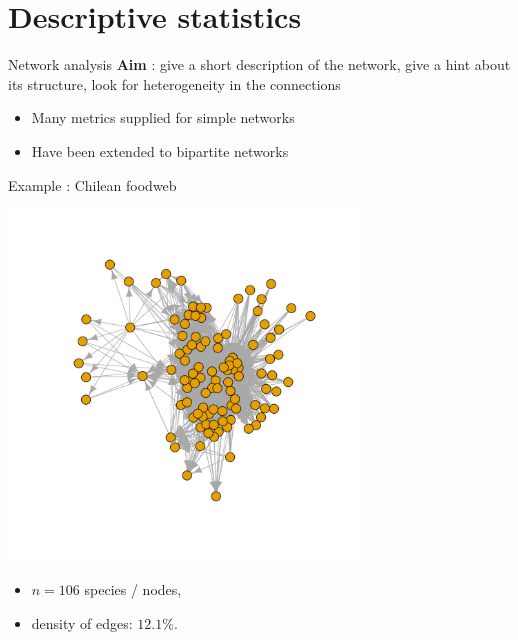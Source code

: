 \documentclass[compress,10pt]{beamer}
\newcommand{\myemph}[1]{\textbf{\textcolor{dgreen}{#1}}}
\begin{document}
\section{Descriptive statistics}


   \begin{frame}{Network analysis}
\myemph{Aim} : give a short description of the network, give a hint about its structure, look  for heterogeneity in the connections
\begin{itemize}
\item Many metrics supplied for simple networks
\item Have been extended to bipartite networks
\end{itemize}
\end{frame}


\begin{frame}{Example : Chilean foodweb}

\cite{kefi}

\centering
\includegraphics[width=0.7\textwidth]{plots/chilean_food_web}

\begin{itemize}
 \item $n=106$ species / nodes,
 \item density of edges: $12.1\%$.
\end{itemize}


\end{frame}
\end{document}
